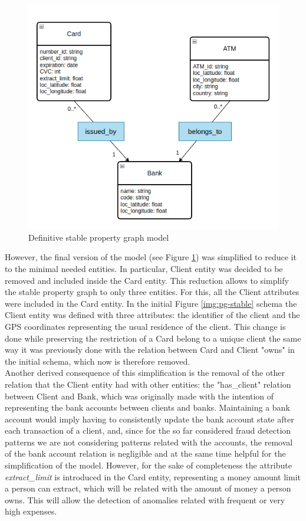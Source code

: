 \documentclass{article}
\begin{document}
\begin{figure}[H]
    \centering
    \includegraphics[scale = 0.6]{images/diag-PG-stable-def-updated.png}
    \caption{Definitive stable property graph model}
    \label{img:pg-stable-def}
\end{figure}

However, the final version of the model (see Figure \ref{img:pg-stable-def}) was simplified to reduce it to the minimal needed entities. In particular, Client entity was decided to be removed and included inside the Card entity. This reduction allows to simplify the stable property graph to only three entities. 
For this, all the Client attributes were included in the Card entity. In the initial Figure \ref{img:pg-stable} schema the Client entity was defined with three attributes: the identifier of the client and the GPS coordinates representing the usual residence of the client. This change is done while preserving the restriction of a Card belong to a unique client the same way it was previously done with the relation between Card and Client "owns" in the initial schema, which now is therefore removed. \\
Another derived consequence of this simplification is the removal of the other relation that the Client entity had with other entities: the "has\_client" relation between Client and Bank, which was originally made with the intention of representing the bank accounts between clients and banks. Maintaining a bank account would imply having to consistently update the bank account state after each transaction of a client, and, since for the so far considered fraud detection patterns we are not considering patterns related with the accounts, the removal of the bank account relation is negligible and at the same time helpful for the simplification of the model. However, for the sake of completeness the attribute \textit{extract\_limit} is introduced in the Card entity, representing a money amount limit a person can extract, which will be related with the amount of money a person owns. This will allow the detection of anomalies related with frequent or very high expenses.
\end{document}
